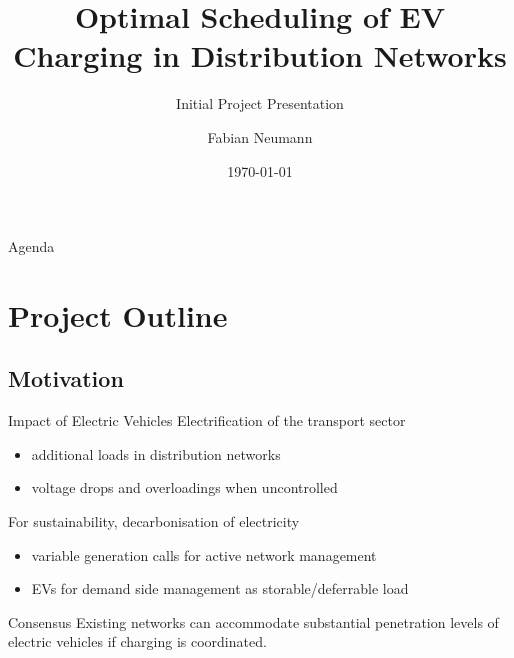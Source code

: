 \documentclass[handout]{beamer}
\title{Optimal Scheduling of EV Charging in Distribution Networks}
\subtitle{Initial Project Presentation}
\author{Fabian Neumann}
\institute[University of Edinburgh] %
{
  Dissertation Project\\
  MSc Sustainable Energy Systems\\
  School of Engineering\\
  The University of Edinburgh
}
\date{\today}
\begin{document}
\begin{frame}
  \titlepage
\end{frame}

\begin{frame}{Agenda}
  \tableofcontents
\end{frame}
\section{Project Outline}

\subsection{Motivation}

\begin{frame}{Impact of Electric Vehicles}%
	Electrification of the \textcolor{UOEred}{transport sector}
	\begin{itemize}
		\item additional loads in distribution networks
		\item voltage drops and overloadings when uncontrolled
	\end{itemize}
	
	For \textcolor{UOEred}{sustainability}, decarbonisation of electricity
	\begin{itemize}
		\item variable generation calls for active network management
		\item EVs for demand side management as storable/deferrable load
	\end{itemize}
	
	\begin{block}{Consensus}
		Existing networks can accommodate substantial penetration levels of electric vehicles if charging is coordinated.
	\end{block}
\end{frame}
\end{document}
